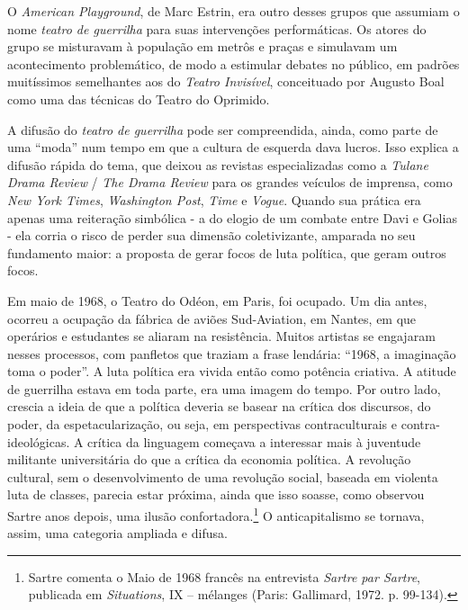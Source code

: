 O \textit{American Playground}, de Marc Estrin, era outro desses grupos que
assumiam o nome \textit{teatro de guerrilha} para suas intervenções
performáticas. Os atores do grupo se misturavam à população em metrôs e
praças e simulavam um acontecimento problemático, de modo a estimular
debates no público, em padrões muitíssimos semelhantes aos do
\textit{Teatro Invisível}, conceituado por Augusto Boal como uma das
técnicas do Teatro do Oprimido.

A difusão do \textit{teatro de guerrilha} pode ser compreendida, ainda,
como parte de uma “moda” num tempo em que a cultura de esquerda dava
lucros. Isso explica a difusão rápida do tema, que deixou as revistas
especializadas como a \textit{Tulane Drama Review} / \textit{The Drama Review}
para os grandes veículos de imprensa, como \textit{New York Times},
\textit{Washington Post}, \textit{Time} e \textit{Vogue}. Quando sua prática era
apenas uma reiteração simbólica - a do elogio de um combate entre Davi e
Golias - ela corria o risco de perder sua dimensão coletivizante,
amparada no seu fundamento maior: a proposta de gerar focos de luta
política, que geram outros focos.

Em maio de 1968, o Teatro do Odéon, em Paris, foi ocupado. Um dia antes,
ocorreu a ocupação da fábrica de aviões Sud-Aviation, em Nantes, em que
operários e estudantes se aliaram na resistência. Muitos artistas se
engajaram nesses processos, com panfletos que traziam a frase lendária:
“1968, a imaginação toma o poder”. A luta política era vivida então como
potência criativa. A atitude de guerrilha estava em toda parte, era uma
imagem do tempo. Por outro lado, crescia a ideia de que a política
deveria se basear na crítica dos discursos, do poder, da
espetacularização, ou seja, em perspectivas contraculturais e
contra-ideológicas. A crítica da linguagem começava a interessar mais à
juventude militante universitária do que a crítica da economia política.
A revolução cultural, sem o desenvolvimento de uma revolução social,
baseada em violenta luta de classes, parecia estar próxima, ainda que
isso soasse, como observou Sartre anos depois, uma ilusão
confortadora.\footnote{Sartre comenta o Maio de 1968 francês na
  entrevista \textit{Sartre par Sartre}, publicada em \textit{Situations}, IX
  -- mélanges (Paris: Gallimard, 1972. p. 99-134).} O anticapitalismo se
tornava, assim, uma categoria ampliada e difusa.

